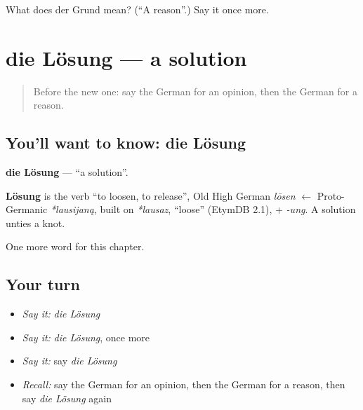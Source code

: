 \begin{tcolorbox}[breakable,colback=teal!4,colframe=teal!35!black,title={Before you move on}]
What does der Grund mean? (\textquotedblleft{}A reason\textquotedblright{}.) Say it once more.
\end{tcolorbox}
\section[die Lösung]{die Lösung — a solution}

\label{lesson:GE-C166-loesung}



\begin{quote}
Before the new one: say the German for an opinion, then the German for a reason.
\end{quote}

\subsection*{You'll want to know: die Lösung}
\textbf{die Lösung} — \textquotedblleft{}a solution\textquotedblright{}.

\begin{cousinweb}
\textbf{Lösung} is the verb \textquotedblleft{}to loosen, to release\textquotedblright{}, Old High German \emph{lōsen} $\leftarrow$ Proto-Germanic \emph{*lausijaną}, built on \emph{*lausaz}, \textquotedblleft{}loose\textquotedblright{} (EtymDB 2.1), + \emph{-ung}. A solution unties a knot.
\end{cousinweb}

\begin{grammarlens}[title={What you've built}]
One more word for this chapter.
\end{grammarlens}

\subsection*{Your turn}
\begin{itemize}
\raggedright
  \item \emph{Say it:} \emph{die Lösung}
  \item \emph{Say it:} \emph{die Lösung}, once more
  \item \emph{Say it:} say \emph{die Lösung}
  \item \emph{Recall:} say the German for an opinion, then the German for a reason, then say \emph{die Lösung} again
\end{itemize}

